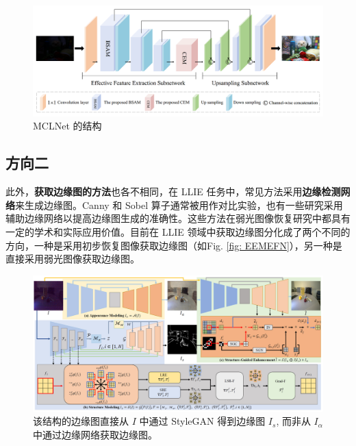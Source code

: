 \documentclass[a4paper, 10pt]{article}
\begin{document}
	\begin{figure}[htbp]
		\centering 
		\includegraphics[width=\columnwidth]{picture/LLIE/MCLNet/Overview}
		\caption{
			\label{fig: MCLNet} 
			MCLNet 的结构
		}
	\end{figure}
	
	\subsection{方向二}
	
	此外，\textbf{获取边缘图的方法}也各不相同，在 LLIE 任务中，常见方法采用\textbf{边缘检测网络}来生成边缘图。Canny 和 Sobel 算子通常被用作对比实验，也有一些研究采用辅助边缘网络以提高边缘图生成的准确性。这些方法在弱光图像恢复研究中都具有一定的学术和实际应用价值。目前在 LLIE 领域中获取边缘图分化成了两个不同的方向，一种是采用初步恢复图像获取边缘图（如Fig. \ref{fig: EEMEFN}），另一种是直接采用弱光图像获取边缘图。
	
	\begin{figure}[htbp]
		\centering 
		\includegraphics[width=\columnwidth]{picture/LLIE/Structure Modeling and Guidance/Overview}
		\caption{
			\label{fig: Overview} 
			该结构的边缘图直接从 $I$ 中通过 StyleGAN 得到边缘图 $I_s$, 而非从 $I_{\alpha}$ 中通过边缘网络获取边缘图。
		}
	\end{figure}
	
\end{document}
